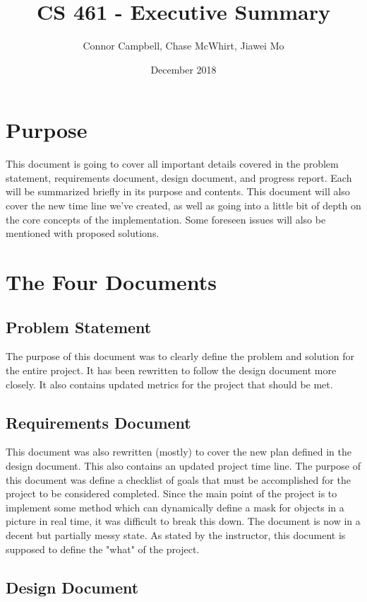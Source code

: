 \documentclass[12pt,journal,compsoc, draftclsnofoot,onecolumn]{IEEEtran}
\title{CS 461 - Executive Summary}
\author{Connor Campbell, Chase McWhirt, Jiawei Mo}
\date{December 2018}
\begin{document}
\maketitle

\section{Purpose}
This document is going to cover all important details covered in the problem statement, requirements document, design document, and progress report.
Each will be summarized briefly in its purpose and contents.
This document will also cover the new time line we've created, as well as going into a little bit of depth on the core concepts of the implementation.
Some foreseen issues will also be mentioned with proposed solutions.

\section{The Four Documents}

\subsection{Problem Statement}

The purpose of this document was to clearly define the problem and solution for the entire project.
It has been rewritten to follow the design document more closely.
It also contains updated metrics for the project that should be met.


\subsection{Requirements Document}

This document was also rewritten (mostly) to cover the new plan defined in the design document.
This also contains an updated project time line.
The purpose of this document was define a checklist of goals that must be accomplished for the project to be considered completed.
Since the main point of the project is to implement some method which can dynamically define a mask for objects in a picture in real time, it was difficult to break this down.
The document is now in a decent but partially messy state.
As stated by the instructor, this document is supposed to define the "what" of the project.


\subsection{Design Document}
\end{document}

